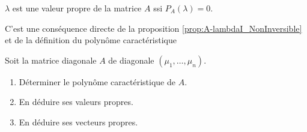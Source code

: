 \bigskip
\begin{theorem}
  $\lambda$ est une valeur propre de la matrice $A$ ssi $P_A(\lambda) = 0$.
\end{theorem}

\proof 
C'est une conséquence directe de la proposition \ref{prop:A-lambdaI_NonInversible} et de la définition du polynôme caractéristique
\eproof

\begin{exercise*}
  Soit la matrice diagonale $A$ de diagonale $(\mu_1, \dots, \mu_n)$.
  \begin{enumerate}
    \item Déterminer le polynôme caractéristique de $A$.
    \item En déduire ses valeurs propres.
    \item En déduire ses vecteurs propres.
  \end{enumerate}
\end{exercise*}

